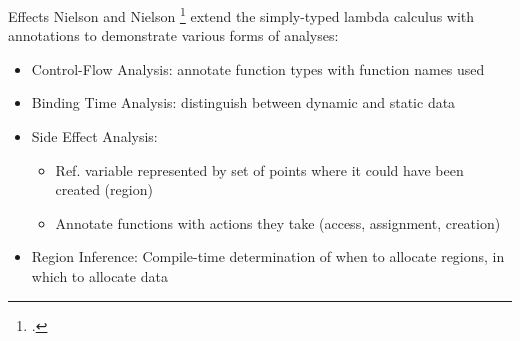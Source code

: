 \documentclass[aspectratio=169]{beamer}
\begin{document}
\begin{frame}{Effects}
    Nielson and Nielson \footcite{nielson_type_1999} extend the simply-typed lambda calculus with annotations to demonstrate various forms of analyses:
    \begin{itemize}[<+->]
        \item Control-Flow Analysis: annotate function types with function names used
        \item Binding Time Analysis: distinguish between dynamic and static data
        \item Side Effect Analysis:
            \begin{itemize}
                \item Ref. variable represented by set of points where it could have been created (\alert{region})
                \item Annotate functions with actions they take (access, assignment, creation)
            \end{itemize}
        \item \alert{Region} Inference: Compile-time determination of when to allocate regions, in which to allocate data
    \end{itemize}
\end{frame}

\end{document}
